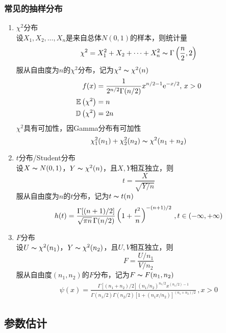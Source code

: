 \subsubsection{常见的抽样分布}
\begin{enumerate}
	\item $\chi^2$分布\\
	设$X_1,X_2,\ldots,X_n$是来自总体$N(0,1)$的样本，则统计量
	\[\chi^2=X_1^2+X_2+\cdots+X_n^2\thicksim\Gamma\left(\frac{n}{2},2\right)\]
	服从自由度为$n$的$\chi^2$分布，记为$\chi^2\thicksim\chi^2(n)$
	\[\begin{aligned}
	f(x)&=\frac{1}{2^{n/2}\Gamma(n/2)}x^{n/2-1}\mathrm{e}^{-x/2},\,x>0\\
	\mathbb{E}\left(\chi^2\right)&=n\\
	\mathbb{D}\left(\chi^2\right)&=2n
	\end{aligned}\]
	$\chi^2$具有可加性，因Gamma分布有可加性
	\[\chi_1^2(n_1)+\chi_2^2(n_2)\thicksim\chi^2(n_1+n_2)\]
	\item $t$分布/Student分布\\
	设$X\thicksim N(0,1)$，$Y\thicksim\chi^2(n)$，且$X,Y$相互独立，则
	\[t=\frac{X}{\sqrt{Y/n}}\]
	服从自由度为$n$的$t$分布，记为$t\thicksim t(n)$
	\[\begin{aligned}
	h(t)=\frac{\Gamma[(n+1)/2]}{\sqrt{\pi n}\,\Gamma(n/2)}\left(1+\frac{t^2}{n}\right)^{-(n+1)/2}\,,t\in(-\infty,+\infty)
	\end{aligned}\]
	\item $F$分布\\
	设$U\thicksim\chi^2(n_1)$，$Y\thicksim\chi^2(n_2)$，且$U,V$相互独立，则
	\[F=\frac{U/n_1}{V/n_2}\]
	服从自由度$(n_1,n_2)$的$F$分布，记为$F\thicksim F(n_1,n_2)$
	\[\begin{aligned}
	\psi(x)=\frac{\Gamma[(n_1+n_2)/2](n_1/n_2)^{n_1/2}x^{(n_1/2)-1}}{\Gamma(n_1/2)\Gamma(n_2/2)[1+(n_1x/n_2)]^{(n_1+n_2)/2}}\,,x>0
	\end{aligned}\]
\end{enumerate}

\subsection{参数估计}
